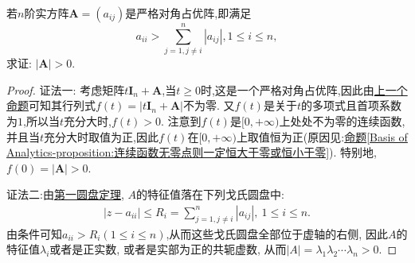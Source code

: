 \documentclass[../../main.tex]{subfiles}
\begin{document}
\begin{proposition}\label{proposition:更严格对角占优阵行列式必大于零}
若\(n\)阶实方阵\(\boldsymbol{A}=(a_{ij})\)是严格对角占优阵,即满足
\[
a_{ii}>\sum_{j = 1,j\neq i}^{n}|a_{ij}|,1\leqslant  i\leqslant  n,
\]
求证: \(|\boldsymbol{A}|>0\).
\end{proposition}
\begin{proof}
{\color{blue}证法一:}
考虑矩阵\(t\boldsymbol{I}_n+\boldsymbol{A}\),当\(t\geqslant 0\)时,这是一个严格对角占优阵,因此由\hyperref[proposition:严格对角占优阵必是非异阵]{上一个命题}可知其行列式\(f(t)=|t\boldsymbol{I}_n+\boldsymbol{A}|\)不为零. 又\(f(t)\)是关于\(t\)的多项式且首项系数为\(1\),所以当\(t\)充分大时,\(f(t)>0\). 注意到\(f(t)\)是\([0,+\infty)\)上处处不为零的连续函数,并且当\(t\)充分大时取值为正,因此\(f(t)\)在\([0,+\infty)\)上取值恒为正(原因见:\hyperref[Basis of Analytics-proposition:连续函数无零点则一定恒大于零或恒小于零]{命题\ref{Basis of Analytics-proposition:连续函数无零点则一定恒大于零或恒小于零}}). 特别地,\(f(0)=|\boldsymbol{A}|>0\).

{\color{blue}证法二:}由\hyperref[theorem:第一圆盘定理]{第一圆盘定理}, \(A\)的特征值落在下列戈氏圆盘中:
\begin{align*}
|z - a_{ii}| \leqslant  R_{i} = \sum_{j = 1,j\neq i}^{n}|a_{ij}|,\ 1 \leqslant  i \leqslant  n.
\end{align*}
由条件可知\(a_{ii} > R_{i}(1 \leqslant  i \leqslant  n)\),从而这些戈氏圆盘全部位于虚轴的右侧, 因此\(A\)的特征值\(\lambda_{i}\)或者是正实数, 或者是实部为正的共轭虚数, 从而\(|A|=\lambda_{1}\lambda_{2}\cdots\lambda_{n}>0\). 
\end{proof}
\end{document}
